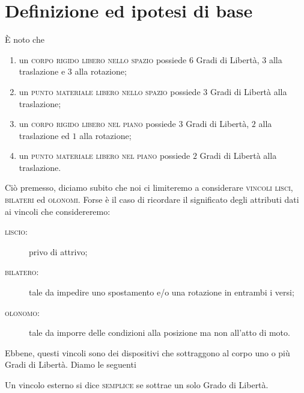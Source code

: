 \section{Definizione ed ipotesi di base}
È noto che
\begin{enumerate}
\item un \textsc{corpo rigido libero nello spazio} possiede $6$ Gradi di Libertà, $3$ alla traslazione e $3$ alla rotazione;
\item un \textsc{punto materiale libero nello spazio} possiede $3$ Gradi di Libertà alla traslazione;
\item un \textsc{corpo rigido libero nel piano} possiede $3$ Gradi di Libertà, $2$ alla traslazione ed $1$ alla rotazione;
\item un \textsc{punto materiale libero nel piano} possiede $2$ Gradi di Libertà alla traslazione.
\end{enumerate}
Ciò premesso, diciamo subito che noi ci limiteremo a considerare \textsc{vincoli lisci}, \textsc{bilateri} ed \textsc{olonomi}. Forse è il caso di ricordare il significato degli attributi dati ai vincoli che considereremo:
\begin{description}
\item[\textsc{liscio}:] privo di attrivo;
\item[\textsc{bilatero}:] tale da impedire uno spostamento e/o una rotazione in entrambi i versi;
\item[\textsc{olonomo}:] tale da imporre delle condizioni alla posizione ma non all'atto di moto. 
\end{description}
Ebbene, questi vincoli sono dei dispositivi che sottraggono al corpo uno o più Gradi di Libertà. Diamo le seguenti
\begin{definizione}
Un vincolo esterno si dice \textsc{semplice} se sottrae un solo Grado di Libertà. 
\end{definizione}
